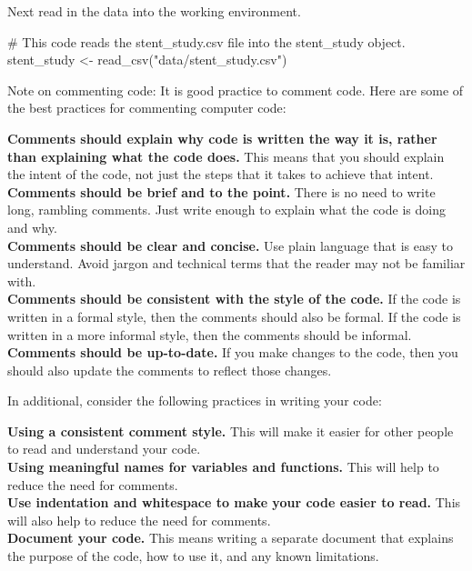 \documentclass[
  letterpaper,
  DIV=11,
  numbers=noendperiod]{scrreprt}
\newenvironment{Shaded}{\begin{snugshade}}{\end{snugshade}}
\newcommand{\CommentTok}[1]{\textcolor[rgb]{0.37,0.37,0.37}{#1}}
\newcommand{\FunctionTok}[1]{\textcolor[rgb]{0.28,0.35,0.67}{#1}}
\newcommand{\NormalTok}[1]{\textcolor[rgb]{0.00,0.23,0.31}{#1}}
\newcommand{\OtherTok}[1]{\textcolor[rgb]{0.00,0.23,0.31}{#1}}
\newcommand{\StringTok}[1]{\textcolor[rgb]{0.13,0.47,0.30}{#1}}
\begin{document}
Next read in the data into the working environment.

\begin{Shaded}
\begin{Highlighting}[]
\CommentTok{\# This code reads the \textasciigrave{}stent\_study.csv\textasciigrave{} file into the \textasciigrave{}stent\_study\textasciigrave{} object.}
\NormalTok{stent\_study }\OtherTok{\textless{}{-}} \FunctionTok{read\_csv}\NormalTok{(}\StringTok{"data/stent\_study.csv"}\NormalTok{)}
\end{Highlighting}
\end{Shaded}

Note on commenting code: It is good practice to comment code. Here are
some of the best practices for commenting computer code:

\textbf{Comments should explain why code is written the way it is,
rather than explaining what the code does.} This means that you should
explain the intent of the code, not just the steps that it takes to
achieve that intent.\\
\textbf{Comments should be brief and to the point.} There is no need to
write long, rambling comments. Just write enough to explain what the
code is doing and why.\\
\textbf{Comments should be clear and concise.} Use plain language that
is easy to understand. Avoid jargon and technical terms that the reader
may not be familiar with.\\
\textbf{Comments should be consistent with the style of the code.} If
the code is written in a formal style, then the comments should also be
formal. If the code is written in a more informal style, then the
comments should be informal.\\
\textbf{Comments should be up-to-date.} If you make changes to the code,
then you should also update the comments to reflect those changes.

In additional, consider the following practices in writing your code:

\textbf{Using a consistent comment style.} This will make it easier for
other people to read and understand your code.\\
\textbf{Using meaningful names for variables and functions.} This will
help to reduce the need for comments.\\
\textbf{Use indentation and whitespace to make your code easier to
read.} This will also help to reduce the need for comments.\\
\textbf{Document your code.} This means writing a separate document that
explains the purpose of the code, how to use it, and any known
limitations.
\end{document}
